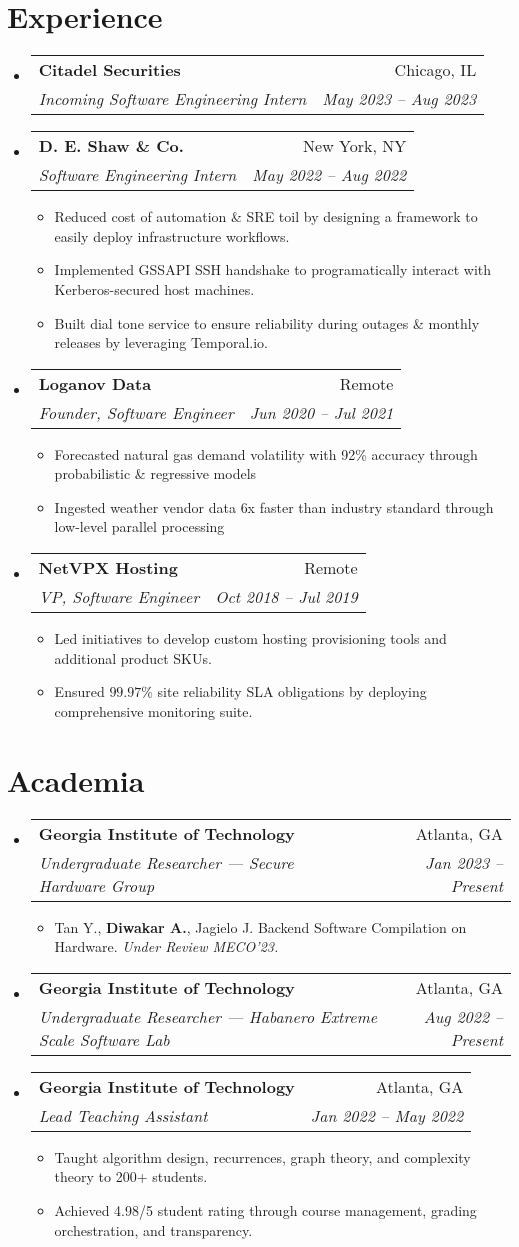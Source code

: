 \documentclass[a4paper,11pt]{extarticle}
\makeatletter
\newcommand{\resumeItem}[1]{
	\item\small{
		#1 \vspace{-1.2pt}
	}
}
\newcommand{\resumeSubheading}[4]{
	\vspace{-1pt}
    \item
		\begin{tabular*}{1\linewidth}{l@{\extracolsep{\fill}}r}
			\textbf{#1} & #2 \\
			\textit{#3} & \textit{#4} \\
		\end{tabular*}\vspace{-2pt}
}
\newcommand{\resumeSubHeadingListStart}{
    \begin{itemize}[leftmargin=0.15in,label={}]}
\newcommand{\resumeSubHeadingListEnd}{\end{itemize}}
\newcommand{\resumeItemListStart}{\begin{itemize}\vspace{-3pt}}
\newcommand{\resumeItemListEnd}{\end{itemize}\vspace{-3pt}}
\makeatother
\begin{document}
\section{Experience}
	\resumeSubHeadingListStart
        \resumeSubheading
            {Citadel Securities}
            {Chicago, IL}
            {Incoming Software Engineering Intern}
            {May 2023 -- Aug 2023}
        \resumeSubheading
            {D. E. Shaw \& Co.}
            {New York, NY}
            {Software Engineering Intern}
            {May 2022 -- Aug 2022}
		\resumeItemListStart
            \resumeItem{Reduced cost of automation \& SRE toil by
                designing a framework to easily deploy infrastructure
                workflows.}
            \resumeItem{Implemented GSSAPI SSH handshake to programatically
                interact with Kerberos-secured host machines.}
            \resumeItem{Built dial tone service to ensure reliability during
                outages \& monthly releases by leveraging Temporal.io.}
		\resumeItemListEnd
		\resumeSubheading
            {Loganov Data}
            {Remote}
		    {Founder, Software Engineer}
            {Jun 2020 -- Jul 2021}
		\resumeItemListStart
			\resumeItem{Forecasted natural gas demand volatility with 92\%
                accuracy through probabilistic \& regressive models}
			\resumeItem{Ingested weather vendor data 6x faster than industry
				standard through low-level parallel processing}
		\resumeItemListEnd
		\resumeSubheading
            {NetVPX Hosting}
            {Remote}
		    {VP, Software Engineer}
            {Oct 2018 -- Jul 2019}
		\resumeItemListStart
			\resumeItem{Led initiatives to develop custom hosting provisioning
				tools and additional product SKUs.}
			\resumeItem{Ensured $99.97$\% site reliability SLA obligations
                by deploying comprehensive monitoring suite.}
		\resumeItemListEnd
	\resumeSubHeadingListEnd

\section{Academia}
	\resumeSubHeadingListStart
        \resumeSubheading
            {Georgia Institute of Technology}
            {Atlanta, GA}
            {Undergraduate Researcher --- Secure Hardware Group}
            {Jan 2023 -- Present}
		\resumeItemListStart
            \resumeItem{Tan Y., \textbf{Diwakar A.}, Jagielo J. Backend
                Software Compilation on Hardware. \textit{Under Review MECO'23.}}
		\resumeItemListEnd
        \resumeSubheading
            {Georgia Institute of Technology}
            {Atlanta, GA}
            {Undergraduate Researcher --- Habanero Extreme Scale Software Lab}
            {Aug 2022 -- Present}
        \resumeSubheading
            {Georgia Institute of Technology}
            {Atlanta, GA}
            {Lead Teaching Assistant}
            {Jan 2022 -- May 2022}
		\resumeItemListStart
			\resumeItem{Taught algorithm design, recurrences, graph
            theory, and complexity theory to 200+ students.}
            \resumeItem{Achieved 4.98/5 student rating through course management,
                grading orchestration, and transparency.}
		\resumeItemListEnd
	\resumeSubHeadingListEnd
\end{document}
